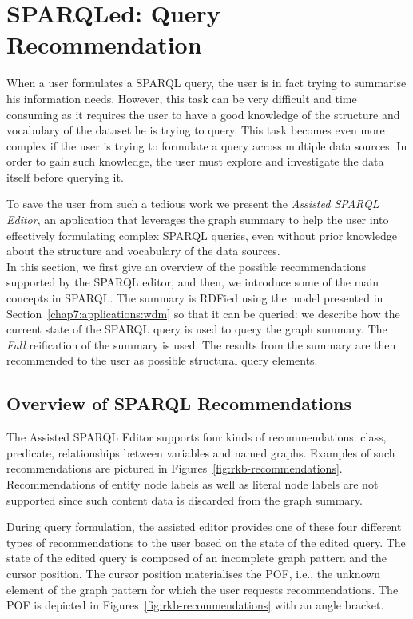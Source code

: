 \section{SPARQLed: Query Recommendation}
\label{sec:exploiting:sparqled:recommendation}

When a user formulates a SPARQL query, the user is in fact trying to summarise his information needs. However, this task can be very difficult and time consuming as it requires the user to have a good knowledge of the structure and vocabulary of the dataset he is trying to query. This task becomes even more complex if the user is trying to formulate a query across multiple data sources. In order to gain such knowledge, the user must explore and investigate the data itself before querying it.

To save the user from such a tedious work we present the \emph{Assisted SPARQL Editor}, an application that leverages the graph summary to help the user into effectively formulating complex SPARQL queries, even without prior knowledge about the structure and vocabulary of the data sources.\\

In this section, we first give an overview of the possible recommendations supported by the SPARQL editor, and then, we introduce some of the main concepts in SPARQL. The summary is RDFied using the model presented in Section~\ref{chap7:applications:wdm} so that it can be queried: we describe how the current state of the SPARQL query is used to query the graph summary. The \emph{Full} reification of the summary is used. The results from the summary are then recommended to the user as possible structural query elements.

\subsection{Overview of SPARQL Recommendations}

The Assisted SPARQL Editor supports four kinds of recommendations: class, predicate, relationships between variables and named graphs. Examples of such recommendations are pictured in Figures~\ref{fig:rkb-recommendations}. Recommendations of entity node labels as well as literal node labels are not supported since such content data is discarded from the graph summary.

During query formulation, the assisted editor provides one of these four different types of recommendations to the user based on the state of the edited query. The state of the edited query is composed of an incomplete graph pattern and the cursor position. The cursor position materialises the \gls{POF}, i.e., the unknown element of the graph pattern for which the user requests recommendations. The \gls{POF} is depicted in Figures~\ref{fig:rkb-recommendations} with an angle bracket.

